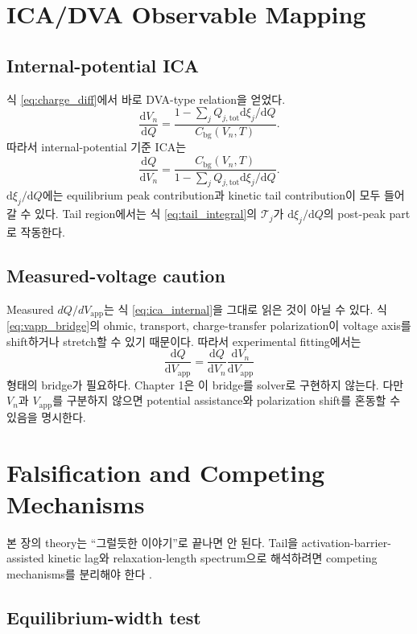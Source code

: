 \documentclass[11pt]{article}
\newcommand{\dd}{\mathrm{d}}
\newcommand{\app}{\mathrm{app}}
\newcommand{\bg}{\mathrm{bg}}
\newcommand{\tot}{\mathrm{tot}}
\begin{document}
\section{ICA/DVA Observable Mapping}\label{sec:ica}

\subsection{Internal-potential ICA}\label{subsec:internal_ica}

식 \eqref{eq:charge_diff}에서 바로 DVA-type relation을 얻었다.
\[
\frac{\dd V_n}{\dd Q}
=
\frac{
1-\sum_j Q_{j,\tot}\dd\xi_j/\dd Q
}{
C_{\bg}(V_n,T)
}.
\]
따라서 internal-potential 기준 ICA는
\begin{equation}
\boxed{
\frac{\dd Q}{\dd V_n}
=
\frac{
C_{\bg}(V_n,T)
}{
1-\sum_j Q_{j,\tot}\dd\xi_j/\dd Q
}.
}
\label{eq:ica_internal}
\end{equation}
\(\dd\xi_j/\dd Q\)에는 equilibrium peak contribution과 kinetic tail contribution이 모두 들어갈 수
있다. Tail region에서는 식 \eqref{eq:tail_integral}의 \(\mathcal T_j\)가
\(\dd\xi_j/\dd Q\)의 post-peak part로 작동한다.

\subsection{Measured-voltage caution}\label{subsec:measured_voltage}

Measured \(dQ/dV_{\app}\)는 식 \eqref{eq:ica_internal}을 그대로 읽은 것이 아닐 수 있다. 식
\eqref{eq:vapp_bridge}의 ohmic, transport, charge-transfer polarization이 voltage axis를 shift하거나
stretch할 수 있기 때문이다. 따라서 experimental fitting에서는
\[
\frac{\dd Q}{\dd V_{\app}}
=
\frac{\dd Q}{\dd V_n}
\frac{\dd V_n}{\dd V_{\app}}
\]
형태의 bridge가 필요하다. Chapter 1은 이 bridge를 solver로 구현하지 않는다. 다만 \(V_n\)과
\(V_{\app}\)를 구분하지 않으면 potential assistance와 polarization shift를 혼동할 수 있음을 명시한다.

\section{Falsification and Competing Mechanisms}\label{sec:falsification}

본 장의 theory는 ``그럴듯한 이야기''로 끝나면 안 된다. Tail을 activation-barrier-assisted kinetic
lag와 relaxation-length spectrum으로 해석하려면 competing mechanisms를 분리해야 한다
\cite{dubarry2022,fly2020}.

\subsection{Equilibrium-width test}\label{subsec:eq_width_test}
\end{document}
